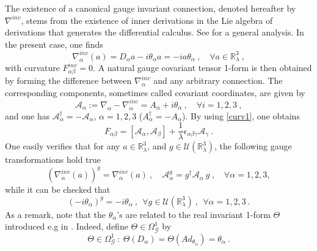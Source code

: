 \documentclass[a4paper,11pt,twoside]{article}
\numberwithin{equation}{section}
\theoremstyle{nonumberplain}
\newcounter{and}
\begin{document}
%
The existence of a canonical gauge invariant connection, denoted hereafter by $\nabla^{inv}$, stems from the existence of inner derivations in the Lie algebra of derivations that generates the differential calculus. See \cite{mdv88-99} for a general analysis. In the present case, one finds
%
\begin{equation} 
\nabla^{inv}_\alpha(a) = D_\alpha a - i \theta_\alpha a = - i a \theta_\alpha \ , \quad \forall a \in \mathbb{R}^3_\lambda \ , \label{invar-connect}
\end{equation}
%
with curvature $F^{inv}_{\alpha\beta}=0$. A natural gauge covariant tensor 1-form is then obtained by forming the difference between $\nabla^{inv}_\alpha$ and any arbitrary connection. The corresponding components, sometimes called covariant coordinates, are given by%
%
\begin{equation}
\mathcal{A}_\alpha := \nabla_\alpha - \nabla^{inv}_\alpha = A_\alpha + i \theta_\alpha \ , \quad \forall i=1,2,3 \ , \label{tens-form}
\end{equation}
%
and one has $\mathcal{A}_\alpha^\dag = - \mathcal{A}_\alpha$, $\alpha=1,2,3$ ($A_\alpha^\dag=-A_\alpha$). By using \eqref{curv1}, one obtains%
%
\begin{equation} 
F_{\alpha\beta} = \left[\mathcal{A}_\alpha,\mathcal{A}_\beta\right] + \frac{1}{\lambda} \epsilon_{\alpha\beta\gamma} \mathcal{A}_\gamma \ . \label{curv2}
\end{equation}
%
One easily verifies that for any $a\in\mathbb{R}^3_\lambda$, and $g\in\mathcal{U}(\mathbb{R}^3_\lambda)$, the following gauge transformations hold true%
%
\begin{equation*}
(\nabla^{inv}_\alpha(a))^g = \nabla^{inv}_\alpha(a) \ , \quad \mathcal{A}^g_\alpha = g^\dag \mathcal{A}_\alpha \ g \ , \quad \forall \alpha=1,2,3,
\end{equation*}
%
while it can be checked that%
%
\begin{equation} 
(-i\theta_\alpha)^g = - i \theta_\alpha \ , \ \ \forall g \in \mathcal{U}(\mathbb{R}^3_\lambda) \ , \ \ \forall \alpha = 1,2,3 \ . \label{conection-invariace}
\end{equation}
%
As a remark, note that the $\theta_\alpha$'s are related to the real invariant 1-form $\Theta$ introduced e.g in \cite{mdv88-99}. Indeed, define $\Theta\in\Omega^1_\mathcal{G}$ by%
%
\begin{equation*}
\Theta \in \Omega^1_\mathcal{G} \ : \ \Theta(D_\alpha) = \Theta(Ad_{\theta_\alpha}) = \theta_\alpha \ .
\end{equation*}
\end{document}
